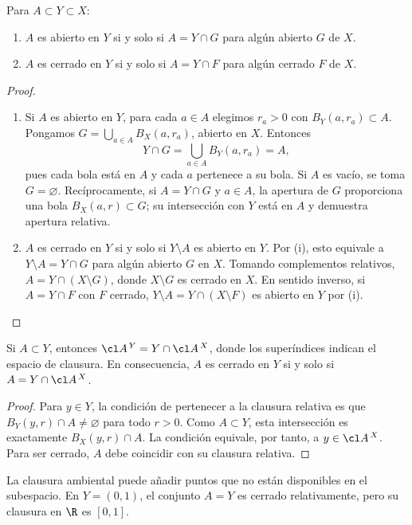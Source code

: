 \begin{teorema}\label{ch04:relativa}
Para $A\subset Y\subset X$:
\begin{enumerate}[label=(\roman*)]
\item $A$ es abierto en $Y$ si y solo si $A=Y\cap G$ para algún abierto $G$ de $X$.
\item $A$ es cerrado en $Y$ si y solo si $A=Y\cap F$ para algún cerrado $F$ de $X$.
\end{enumerate}
\end{teorema}
\begin{proof}
\begin{enumerate}[label=(\roman*)]
\item Si $A$ es abierto en $Y$, para cada $a\in A$ elegimos $r_a>0$ con $B_Y(a,r_a)\subset A$. Pongamos $G=\bigcup_{a\in A}B_X(a,r_a)$, abierto en $X$. Entonces
\[
Y\cap G=\bigcup_{a\in A}B_Y(a,r_a)=A,
\]
pues cada bola está en $A$ y cada $a$ pertenece a su bola. Si $A$ es vacío, se toma $G=\varnothing$. Recíprocamente, si $A=Y\cap G$ y $a\in A$, la apertura de $G$ proporciona una bola $B_X(a,r)\subset G$; su intersección con $Y$ está en $A$ y demuestra apertura relativa.
\item $A$ es cerrado en $Y$ si y solo si $Y\setminus A$ es abierto en $Y$. Por (i), esto equivale a $Y\setminus A=Y\cap G$ para algún abierto $G$ en $X$. Tomando complementos relativos, $A=Y\cap(X\setminus G)$, donde $X\setminus G$ es cerrado en $X$. En sentido inverso, si $A=Y\cap F$ con $F$ cerrado, $Y\setminus A=Y\cap(X\setminus F)$ es abierto en $Y$ por (i).
\end{enumerate}
\end{proof}

\begin{proposicion}\label{ch04:clausura}
Si $A\subset Y$, entonces $\cl A^{\,Y}=Y\cap\cl A^{\,X}$, donde los superíndices indican el espacio de clausura. En consecuencia, $A$ es cerrado en $Y$ si y solo si $A=Y\cap\cl A^{\,X}$.
\end{proposicion}
\begin{proof}
Para $y\in Y$, la condición de pertenecer a la clausura relativa es que $B_Y(y,r)\cap A\ne\varnothing$ para todo $r>0$. Como $A\subset Y$, esta intersección es exactamente $B_X(y,r)\cap A$. La condición equivale, por tanto, a $y\in\cl A^{\,X}$. Para ser cerrado, $A$ debe coincidir con su clausura relativa.
\end{proof}
La clausura ambiental puede añadir puntos que no están disponibles en el subespacio. En $Y=(0,1)$, el conjunto $A=Y$ es cerrado relativamente, pero su clausura en $\R$ es $[0,1]$.

